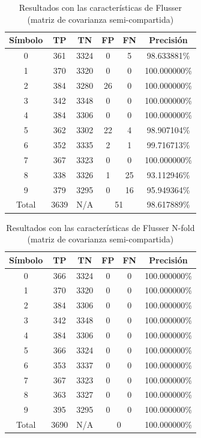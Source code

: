 \documentclass[a4paper, 11pt, oneside]{report}
\begin{document}
\begin{table}
\centering
\begin{tabular}{|c|c|c|c|c|c|}
	\hline
	Símbolo & TP & TN & FP & FN & Precisión \\ 
	\hline
	0 & 361 & 3324 & 0 & 5 & 98.633881\% \\ 
	1 & 370 & 3320 & 0 & 0 & 100.000000\% \\ 
	2 & 384 & 3280 & 26 & 0 & 100.000000\% \\ 
	3 & 342 & 3348 & 0 & 0 & 100.000000\% \\ 
	4 & 384 & 3306 & 0 & 0 & 100.000000\% \\ 
	5 & 362 & 3302 & 22 & 4 & 98.907104\% \\ 
	6 & 352 & 3335 & 2 & 1 & 99.716713\% \\ 
	7 & 367 & 3323 & 0 & 0 & 100.000000\% \\ 
	8 & 338 & 3326 & 1 & 25 & 93.112946\% \\ 
	9 & 379 & 3295 & 0 & 16 & 95.949364\% \\ 
	\hline
	Total & 3639 & N/A & \multicolumn{2}{|c|}{51} & 98.617889\% \\
	\hline
\end{tabular}
\caption{Resultados con las características de Flusser (matriz de covarianza semi-compartida)}
\label{tb:numFlShared}
\end{table}

\begin{table}
\centering
\begin{tabular}{|c|c|c|c|c|c|}
	\hline
	Símbolo & TP & TN & FP & FN & Precisión \\ 
	\hline
	0 & 366 & 3324 & 0 & 0 & 100.000000\% \\ 
	1 & 370 & 3320 & 0 & 0 & 100.000000\% \\ 
	2 & 384 & 3306 & 0 & 0 & 100.000000\% \\ 
	3 & 342 & 3348 & 0 & 0 & 100.000000\% \\ 
	4 & 384 & 3306 & 0 & 0 & 100.000000\% \\ 
	5 & 366 & 3324 & 0 & 0 & 100.000000\% \\ 
	6 & 353 & 3337 & 0 & 0 & 100.000000\% \\ 
	7 & 367 & 3323 & 0 & 0 & 100.000000\% \\ 
	8 & 363 & 3327 & 0 & 0 & 100.000000\% \\ 
	9 & 395 & 3295 & 0 & 0 & 100.000000\% \\ 
	\hline
	Total & 3690 & N/A & \multicolumn{2}{|c|}{0} & 100.000000\% \\
	\hline
\end{tabular}
\caption{Resultados con las características de Flusser N-fold (matriz de covarianza semi-compartida)}
\label{tb:numRotShared}
\end{table}
\end{document}
